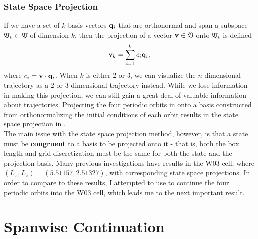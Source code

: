 \subsubsection{State Space Projection}
If we have a set of $k$ basis vectors $\mathbf{q}_i$ that are orthonormal and span a subspace $\mathfrak{V}_k \subset \mathfrak{V}$ of dimension $k$, then the projection of a vector $\mathbf{v} \in \mathfrak{V}$ onto $\mathfrak{V}_k$ is defined 
\begin{equation}
\Vector{v}_k = \sum{i = 1}{k}{c_i \Vector{q}_i},
\end{equation}
where $c_i = \mathbf{v} \cdot \mathbf{q}_i$. When $k$ is either 2 or 3, we can visualize the $n$-dimensional trajectory as a 2 or 3 dimensional trajectory instead. While we lose information in making this projection, we can still gain a great deal of valuable information about trajectories. Projecting the four periodic orbits in  onto a basis constructed from orthonormalizing the initial conditions of each orbit results in the state space projection in .\\

 The main issue with the state space projection method, however, is that a state must be {\bf congruent} to a basis to be projected onto it - that is, both the box length and grid discretization must be the same for both the state and the projection basis. Many previous investigations have results in the W03 cell, where $(L_x,L_z) = (5.51157,2.51327)$, with corresponding state space projections. In order to compare to these results, I attempted to use  to continue the four periodic orbits into the W03 cell, which leads me to the next important result.

\section{Spanwise Continuation}

